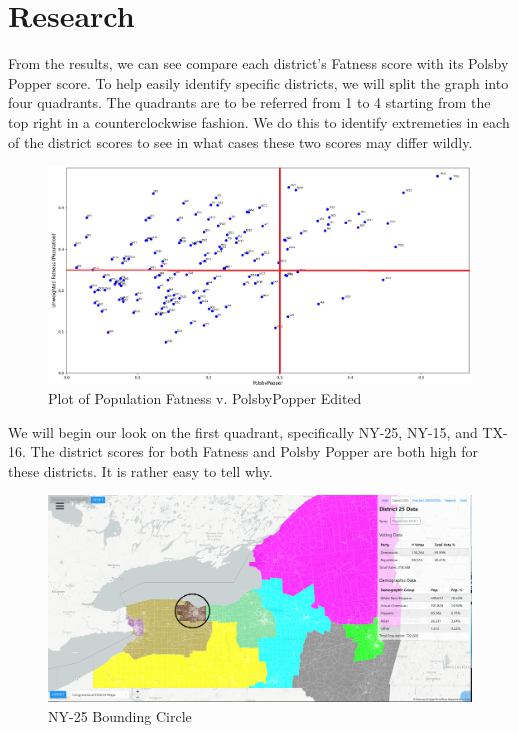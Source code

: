 \documentclass[letterpaper]{article}
\begin{document}
\section{Research}
From the results, we can see compare each district's Fatness score with its Polsby Popper score. To help easily identify specific districts, we will split the graph into four quadrants. The quadrants are to be referred from 1 to 4 starting from the top right in a counterclockwise fashion. We do this to identify extremeties in each of the district scores to see in what cases these two scores may differ wildly.

\begin{figure}[H]
	\includegraphics[width=\linewidth]{./figures/fatnessPopulationVpolsbyPopperEdited.png}
	\caption{Plot of Population Fatness v. PolsbyPopper Edited}
	\label{fig:datapointsEdited}
\end{figure}

We will begin our look on the first quadrant, specifically NY-25, NY-15, and TX-16. The district scores for both Fatness and Polsby Popper are both high for these districts. It is rather easy to tell why.

\begin{figure}[H]
	\includegraphics[width=\linewidth]{./figures/NY-25-BoundingCircle.png}
	\caption{NY-25 Bounding Circle}
	\label{fig:ny25boundingCircle}
\end{figure}
\end{document}
